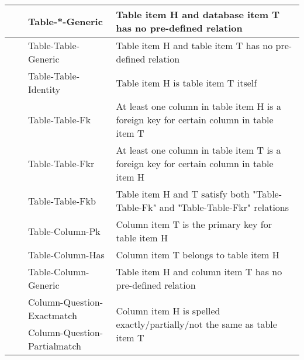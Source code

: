\documentclass[11pt]{article}
\begin{document}
\begin{table*}
{\begin{tabular}{llll}
                     &                  & Table-*-Generic              & Table item H and database item T has no pre-defined relation                                                             \\ \midrule
    \multirow{5}{*}{}  & \multirow{5}{*}{}  & Table-Table-Generic          & Table item H and table item T has no pre-defined relation                                \\ \cmidrule{3-4} 
                        &                     & Table-Table-Identity         & Table item H is table item T itself                                                                \\ \cmidrule{3-4} 
                        &                     & Table-Table-Fk               & At least one column in table item H is a foreign key for certain column in table item T     \\
                        &                     & Table-Table-Fkr              &       At least one column in table item T is a foreign key for certain column in table item H                                                                             \\
                        &                     & Table-Table-Fkb              &   Table item H and  T satisfy both "Table-Table-Fk" and "Table-Table-Fkr" relations                                                                        \\ \midrule
    \multirow{3}{*}{}  & \multirow{3}{*}{}  & Table-Column-Pk              & Column item T is the primary key for table item H                                            \\  
                        &                     & Table-Column-Has             & Column item T belongs to table item H                                                                \\ \cmidrule{3-4} 
                        &                     & Table-Column-Generic         & Table item H and column item T has no pre-defined relation                       \\ \midrule
    \multirow{4}{*}{}  & \multirow{4}{*}{}  & Column-Question-Exactmatch    & \multirow{3}{*}{Column item H is spelled exactly/partially/not the same as table item T}                                     \\
                        &                     & Column-Question-Partialmatch &                                                                                    \\

\end{tabular}}
\end{table*}
\end{document}
